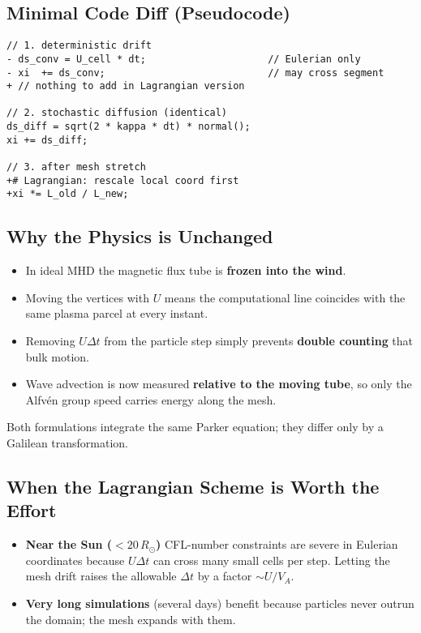 \subsection*{Minimal Code Diff (Pseudocode)}

\begin{verbatim}
// 1. deterministic drift
- ds_conv = U_cell * dt;                     // Eulerian only
- xi  += ds_conv;                            // may cross segment
+ // nothing to add in Lagrangian version

// 2. stochastic diffusion (identical)
ds_diff = sqrt(2 * kappa * dt) * normal();
xi += ds_diff;

// 3. after mesh stretch
+# Lagrangian: rescale local coord first
+xi *= L_old / L_new;
\end{verbatim}

\subsection*{Why the Physics is Unchanged}

\begin{itemize}
\item In ideal MHD the magnetic flux tube is \textbf{frozen into the wind}.
\item Moving the vertices with $U$ means the computational line coincides with the same plasma parcel at every instant.
\item Removing $U\Delta t$ from the particle step simply prevents \textbf{double counting} that bulk motion.
\item Wave advection is now measured \textbf{relative to the moving tube}, so only the Alfvén group speed carries energy along the mesh.
\end{itemize}

Both formulations integrate the same Parker equation; they differ only by a Galilean transformation.

\subsection*{When the Lagrangian Scheme is Worth the Effort}

\begin{itemize}
\item \textbf{Near the Sun ($< 20\,R_\odot$)} CFL-number constraints are severe in Eulerian coordinates because $U \Delta t$ can cross many small cells per step. Letting the mesh drift raises the allowable $\Delta t$ by a factor $\sim U/V_A$.
\item \textbf{Very long simulations} (several days) benefit because particles never outrun the domain; the mesh expands with them.
\end{itemize}

